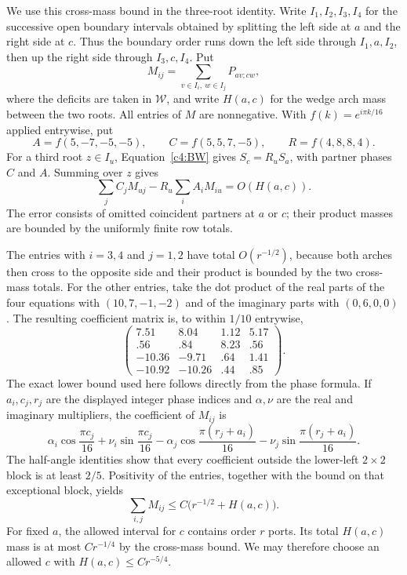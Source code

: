 We use this cross-mass bound in the three-root identity. Write
$I_1,I_2,I_3,I_4$ for the successive open boundary intervals obtained
by splitting the left side at $a$ and the right side at $c$. Thus the
boundary order runs down the left side through $I_1,a,I_2$, then up
the right side through $I_3,c,I_4$. Put
\[
 M_{ij}=\sum_{v\in I_i,\ w\in I_j}P_{av;cw},
\]
where the deficits are taken in $\mathcal W$, and write $H(a,c)$ for
the wedge arch mass between the two roots. All entries of $M$ are
nonnegative. With $f(k)=e^{i\pi k/16}$ applied entrywise, put
\[
 A=f(5,-7,-5,-5),\qquad C=f(5,5,7,-5),\qquad R=f(4,8,8,4).
\]
For a third root $z\in I_u$, Equation~\eqref{c4:BW} gives
$S_c=R_uS_a$, with partner phases $C$ and $A$. Summing over $z$ gives
\[
 \sum_j C_jM_{uj}-R_u\sum_i A_iM_{iu}=O(H(a,c)).
\]
The error consists of omitted coincident partners at $a$ or $c$;
their product masses are bounded by the uniformly finite row totals.

The entries with $i=3,4$ and $j=1,2$ have total $O(r^{-1/2})$,
because both arches then cross to the opposite side and their product
is bounded by the two cross-mass totals. For the other entries, take
the dot product of the real parts of the four equations with
$(10,7,-1,-2)$ and of the imaginary parts with $(0,6,0,0)$. The
resulting coefficient matrix is, to within $1/10$ entrywise,
\[
 \begin{pmatrix}
  7.51&8.04&1.12&5.17\\
  .56&.84&8.23&.56\\
  -10.36&-9.71&.64&1.41\\
  -10.92&-10.26&.44&.85
 \end{pmatrix}.
\]
The exact lower bound used here follows directly from the phase
formula. If $a_i,c_j,r_j$ are the displayed integer phase indices and
$\alpha,\nu$ are the real and imaginary multipliers, the coefficient
of $M_{ij}$ is
\[
 \alpha_i\cos\frac{\pi c_j}{16}
 +\nu_i\sin\frac{\pi c_j}{16}
 -\alpha_j\cos\frac{\pi(r_j+a_i)}{16}
 -\nu_j\sin\frac{\pi(r_j+a_i)}{16}.
\]
The half-angle identities show that every coefficient outside the
lower-left $2\times2$ block is at least $2/5$. Positivity of the
entries, together with the bound on that exceptional block, yields
\[
                \sum_{i,j}M_{ij}\le
                   C\bigl(r^{-1/2}+H(a,c)\bigr).
\]
For fixed $a$, the allowed interval for $c$ contains order $r$ ports.
Its total $H(a,c)$ mass is at most $Cr^{-1/4}$ by the cross-mass bound.
We may therefore choose an allowed $c$ with
$H(a,c)\le C r^{-5/4}$.

